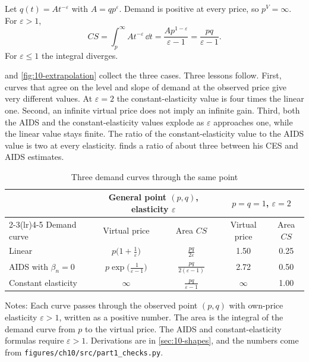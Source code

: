 Let $q(t) = At^{-\varepsilon}$ with $A = qp^{\varepsilon}$. Demand is positive at every price, so $p^V = \infty$.
For $\varepsilon > 1$,
\begin{equation*}
  CS = \int_p^{\infty}At^{-\varepsilon}\,\dd t = \frac{Ap^{1-\varepsilon}}{\varepsilon - 1} = \frac{pq}{\varepsilon - 1}.
\end{equation*}
For $\varepsilon \le 1$ the integral diverges.

 and \cref{fig:10-extrapolation} collect the three cases. Three lessons follow. First,
curves that agree on the level and slope of demand at the observed price give very different values. At
$\varepsilon = 2$ the constant-elasticity value is four times the linear one. Second, an infinite virtual price
does not imply an infinite gain. Third, both the AIDS and the constant-elasticity values explode as
$\varepsilon$ approaches one, while the linear value stays finite. The ratio of the constant-elasticity value
to the AIDS value is two at every elasticity. \citet[p.~231]{Hausman1997} finds a ratio of about three
between his CES and AIDS estimates.

\begin{table}[htbp]
\centering
\caption{Three demand curves through the same point}\label{tab:10-shapes}
\begin{threeparttable}
\begin{tabular}{@{}lcccc@{}}
\toprule
 & \multicolumn{2}{c}{General point $(p,q)$, elasticity $\varepsilon$} & \multicolumn{2}{c}{$p = q = 1$, $\varepsilon = 2$} \\
\cmidrule(lr){2-3}\cmidrule(lr){4-5}
Demand curve & Virtual price & Area $CS$ & Virtual price & Area $CS$ \\
\midrule
Linear & $p\bigl(1 + \frac{1}{\varepsilon}\bigr)$ & $\frac{pq}{2\varepsilon}$ & 1.50 & 0.25 \\[4pt]
AIDS with $\beta_n = 0$ & $p\exp\bigl(\frac{1}{\varepsilon - 1}\bigr)$ & $\frac{pq}{2(\varepsilon - 1)}$ & 2.72 & 0.50 \\[4pt]
Constant elasticity & $\infty$ & $\frac{pq}{\varepsilon - 1}$ & $\infty$ & 1.00 \\
\bottomrule
\end{tabular}
\begin{tablenotes}[flushleft]\footnotesize
\item Notes: Each curve passes through the observed point $(p,q)$ with own-price elasticity $\varepsilon > 1$,
written as a positive number. The area is the integral of the demand curve from $p$ to the virtual price. The
AIDS and constant-elasticity formulas require $\varepsilon > 1$. Derivations are in \cref{sec:10-shapes}, and
the numbers come from \texttt{figures/ch10/src/part1\_checks.py}.
\end{tablenotes}
\end{threeparttable}
\end{table}

